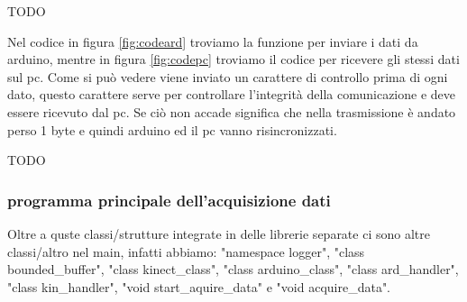 \documentclass[10pt,a4paper]{article}
\begin{document}
TODO \newpage

Nel codice in figura \ref{fig:codeard} troviamo la funzione per inviare i dati da arduino, mentre in figura \ref{fig:codepc} troviamo il codice per ricevere gli stessi dati sul pc. Come si pu\`o vedere viene inviato un carattere di controllo prima di ogni dato, questo carattere serve per controllare l'integrit\`a della comunicazione e deve essere ricevuto dal pc. Se ci\`o non accade significa che nella trasmissione \`e andato perso 1 byte e quindi arduino ed il pc vanno risincronizzati. 


TODO \newpage

%
%
\subsubsection{programma principale dell'acquisizione dati}
Oltre a quste classi/strutture integrate in delle librerie separate ci sono altre classi/altro nel main, infatti abbiamo: "namespace logger", "class bounded\_buffer", "class kinect\_class", "class arduino\_class", "class ard\_handler", "class kin\_handler", "void start\_aquire\_data" e "void acquire\_data".
%
%
\end{document}
